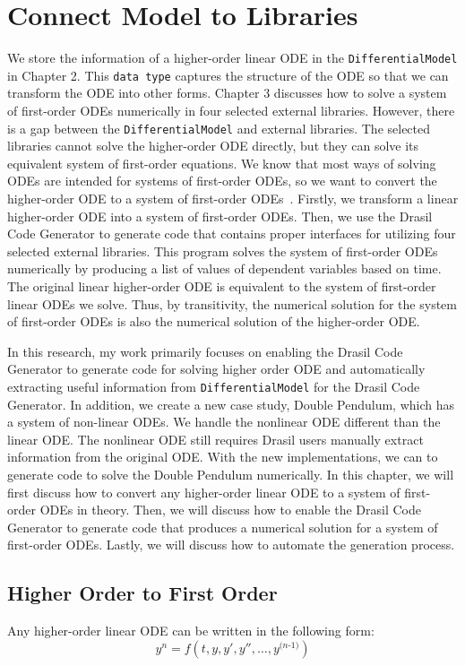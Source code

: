 \chapter{Connect Model to Libraries}
We store the information of a higher-order linear ODE in the \verb|DifferentialModel| in Chapter 2. This \verb|data type| captures the structure of the ODE so that we can transform the ODE into other forms. Chapter 3 discusses how to solve a system of first-order ODEs numerically in four selected external libraries. However, there is a gap between the \verb|DifferentialModel| and external libraries. The selected libraries cannot solve the higher-order ODE directly, but they can solve its equivalent system of first-order equations. We know that most ways of solving ODEs are intended for systems of first-order ODEs, so we want to convert the higher-order ODE to a system of first-order ODEs~\citep{converthigherode}. Firstly, we transform a linear higher-order ODE into a system of first-order ODEs. Then, we use the Drasil Code Generator to generate code that contains proper interfaces for utilizing four selected external libraries. This program solves the system of first-order ODEs numerically by producing a list of values of dependent variables based on time. The original linear higher-order ODE is equivalent to the system of first-order linear ODEs we solve. Thus, by transitivity, the numerical solution for the system of first-order ODEs is also the numerical solution of the higher-order ODE.

In this research, my work primarily focuses on enabling the Drasil Code Generator to generate code for solving higher order ODE and automatically extracting useful information from \verb|DifferentialModel| for the Drasil Code Generator. In addition, we create a new case study, Double Pendulum, which has a system of non-linear ODEs. We handle the nonlinear ODE different than the linear ODE. The nonlinear ODE still requires Drasil users manually extract information from the original ODE. With the new implementations, we can to generate code to solve the Double Pendulum numerically. In this chapter, we will first discuss how to convert any higher-order linear ODE to a system of first-order ODEs in theory. Then, we will discuss how to enable the Drasil Code Generator to generate code that produces a numerical solution for a system of first-order ODEs. Lastly, we will discuss how to automate the generation process.

\section{Higher Order to First Order}
\label{se_hightofirst}
Any higher-order linear ODE can be written in the following form:
\begin{equation} \label{eq_isohighode}
  y^n = f (t, y, y', y'', \dots, y^{\textit{(n-1)}})
\end{equation}

